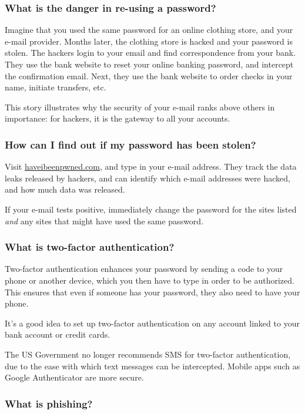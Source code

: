\subsubsection{What is the danger in re-using a password?}

Imagine that you used the same password for an online clothing store, and your e-mail provider. Months later, the clothing store is hacked and your password is stolen. The hackers login to your email and find correspondence from your bank. They use the bank website to reset your online banking password, and intercept the confirmation email. Next, they use the bank website to order checks in your name, initiate transfers, etc.

This story illustrates why the security of your e-mail ranks above others in importance: for hackers, it is the gateway to all your accounts.

\subsubsection{How can I find out if my password has been stolen?}

Visit \url{haveibeenpwned.com}, and type in your e-mail address. They track the data leaks released by hackers, and can identify which e-mail addresses were hacked, and how much data was released.

If your e-mail tests positive, immediately change the password for the sites listed \textit{and} any sites that might have used the same password. 

\subsubsection{What is two-factor authentication?}

Two-factor authentication enhances your password by sending a code to your phone or another device, which you then have to type in order to be authorized. This ensures that even if someone has your password, they also need to have your phone.

It's a good idea to set up two-factor authentication on any account linked to your bank account or credit cards.

The US Government no longer recommends SMS for two-factor authentication, due to the ease with which text messages can be intercepted. Mobile apps such as Google Authenticator are more secure.

\subsubsection{What is phishing?}

